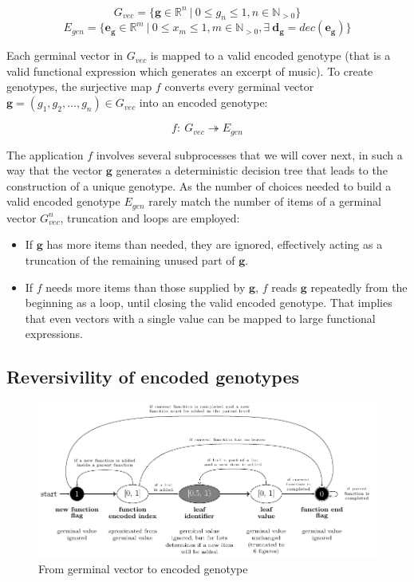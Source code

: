\documentclass{article}
\renewcommand{\vec}[1]{\mathbf{#1}}
\begin{document}
$$ G_{vec} = \{\vec{g} \in \mathbb{R}^n \: | \: 0 \leq g_n \leq1, n \in \mathbb N_{> 0} \} $$
$$ E_{gen} = \{\vec{e_g} \in \mathbb{R}^m \: | \: 0 \leq x_m \leq1, m \in \mathbb N_{> 0}, \exists \: \vec{d_g} = dec(\vec{e_g}) \} $$

Each germinal vector in $G_{vec}$ is mapped to a valid encoded genotype (that is a valid functional expression which generates an excerpt of music). To create genotypes, the surjective map $f$ converts every germinal vector $\vec{g} = (g_1, g_2, ..., g_n) \in G_{vec}$ into an encoded genotype: 

$$f:\ G_{vec}\twoheadrightarrow E_{gen}$$

The application $f$ involves several subprocesses that we will cover next, in such a way that the vector $\vec{g}$ generates a deterministic decision tree that leads to the construction of a unique genotype. As the number of choices needed to build a valid encoded genotype $E_{gen}$ rarely match the number of items of a germinal vector $G_{vec}^n$, truncation and loops are employed:

\begin{itemize}
\item If $\vec{g}$ has more items than needed, they are ignored, effectively acting as a truncation of the remaining unused part of $\vec{g}$.

\item If $f$ needs more items than those supplied by $\vec{g}$, $f$ reads $\vec{g}$ repeatedly from the beginning as a loop, until closing the valid encoded genotype. That implies that even vectors with a single value can be mapped to large functional expressions. 

\end{itemize}


\subsection{Reversivility of encoded genotypes}

\begin{figure}[H]
  \includegraphics[width=\linewidth]{figs/germinal_vector_to_encoded_genotype_coding/germinal_vector_to_encoded_genotype_coding.pdf}
  \caption{From germinal vector to encoded genotype}
  \label{fig:fromGerminalToEncGen}
\end{figure}
\end{document}
